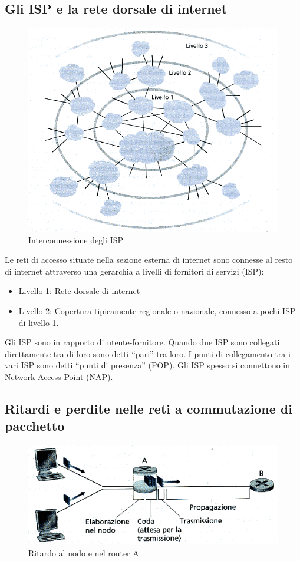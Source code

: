 \documentclass[11pt,a4paper]{article}
\begin{document}
\subsection{Gli ISP e la rete dorsale di internet}
\begin{figure}
	\includegraphics[scale=0.6]{img/006.png}
	\caption{Interconnessione degli ISP}
\end{figure}
Le reti di accesso situate nella sezione esterna di internet sono connesse al resto di internet attraverso una gerarchia a livelli di fornitori di servizi (ISP):
\begin{itemize}
	\item Livello 1: Rete dorsale di internet
	\item Livello 2: Copertura tipicamente regionale o nazionale, connesso a pochi ISP di livello 1.
\end{itemize}
Gli ISP sono in rapporto di utente-fornitore.
Quando due ISP sono collegati direttamente tra di loro sono detti “pari” tra loro.
I punti di collegamento tra i vari ISP sono detti “punti di presenza” (POP).
Gli ISP spesso si connettono in Network Access Point (NAP).

\subsection{Ritardi e perdite nelle reti a commutazione di pacchetto}
\begin{figure}
	\includegraphics[scale=0.6]{img/007.png}
	\caption{Ritardo al nodo e nel router A}
\end{figure}
\end{document}
